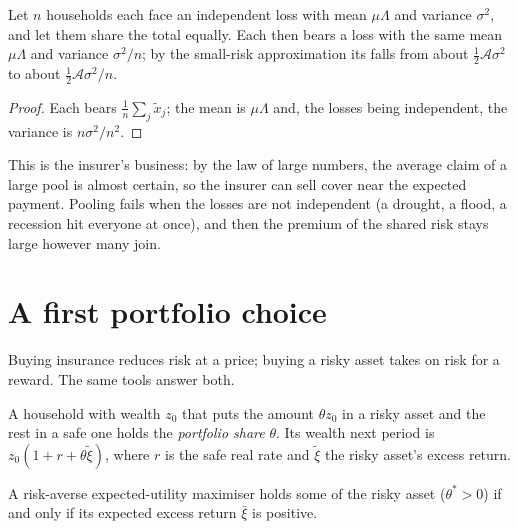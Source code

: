 \begin{proposition}[Pooling]\label{prop:b2:insurance-and-risk-sharing:pooling}
Let $n$ households each face an independent loss with mean $\mu\Lambda$ and variance $\sigma^2$, and
let them share the total equally. Each then bears a loss with the same mean $\mu\Lambda$ and variance
$\sigma^2/n$; by the small-risk approximation its  falls from about
$\tfrac12\mathcal{A}\sigma^2$ to about $\tfrac12\mathcal{A}\sigma^2/n$.
\end{proposition}

\begin{proof}
Each bears $\frac1n\sum_j \tilde x_j$; the mean is $\mu\Lambda$ and, the losses being independent, the
variance is $n\sigma^2/n^2$.
\end{proof}

This is the insurer's business: by the law of large numbers, the average claim of a large pool is
almost certain, so the insurer can sell cover near the expected payment. Pooling fails when the losses
are not independent (a drought, a flood, a recession hit everyone at once), and then the premium of
the shared risk stays large however many join.

\section{A first portfolio choice}\label{sec:b2:insurance-and-risk-sharing:portfolio}

Buying insurance reduces risk at a price; buying a risky asset takes on risk for a reward. The same
tools answer both.

\begin{definition}\label{def:b2:insurance-and-risk-sharing:portfolio-share}
A household with wealth $z_0$ that puts the amount $\theta z_0$ in a risky asset and the rest in a safe
one holds the \emph{portfolio share} $\theta$. Its wealth next period is $z_0(1
+ r + \theta\tilde\xi)$, where $r$ is the safe real rate and $\tilde\xi$ the risky asset's excess
return.
\end{definition}

\begin{proposition}\label{prop:b2:insurance-and-risk-sharing:arrow-portfolio}
A risk-averse expected-utility maximiser holds some of the risky asset ($\theta^{*} > 0$) if and only
if its expected excess return $\bar\xi$ is positive.
\end{proposition}

